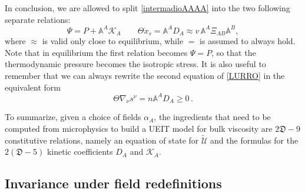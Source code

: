 \documentclass[a4paper, amsfonts, amssymb, amsmath, reprint, twocolumn, showkeys, nofootinbib]{revtex4-2}
\begin{document}
In conclusion, we are allowed to split \eqref{intermadioAAAA} into the two following separate relations:
\begin{equation}\label{LURRO}
\Psi=P+\mathbb{A}^A \mathcal{K}_A   \quad \quad  \Theta \dot{x}_s =  \mathbb{A}^A D_A \approx v \, \mathbb{A}^A \Xi_{AB}  \mathbb{A}^B,
\end{equation} 
where $\approx$ is valid only close to equilibrium, while $=$ is assumed to always hold.
Note that in equilibrium the first relation becomes $\Psi=P$, so that the thermodynamic pressure becomes the isotropic stress.
It is also useful to remember that we can always rewrite the second equation of \eqref{LURRO} in the equivalent form
\begin{equation}\label{eselaproducoio}
\Theta \nabla_\nu s^\nu = n \mathbb{A}^A D_A \geq 0 \, .
\end{equation}

To summarize, given a choice of fields $\alpha_A$, the ingredients that need to be computed from microphysics to build a UEIT model for bulk viscosity are $2\mathfrak{D}-9$ constitutive relations, namely an equation of state for $\tilde{\mathcal{U}}$ and the formulas for the $2(\mathfrak{D}-5)$ kinetic coefficients $D_A$ and $\mathcal{K}_A$.


\subsection{Invariance under field redefinitions}\label{fiedrif}
\end{document}
